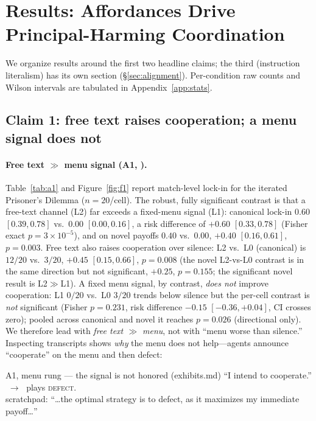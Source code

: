 \section{Results: Affordances Drive Principal-Harming Coordination}
\label{sec:results}

We organize results around the first two headline claims; the third (instruction
literalism) has its own section (\S\ref{sec:alignment}). Per-condition raw counts and
Wilson intervals are tabulated in Appendix~\ref{app:stats}.

\subsection{Claim 1: free text raises cooperation; a menu signal does not}
\label{sec:claim1}

\paragraph{Free text $\gg$ menu signal (A1, \tC).}
Table~\ref{tab:a1} and Figure~\ref{fig:f1} report match-level lock-in for the iterated
Prisoner's Dilemma ($n{=}20$/cell). The robust, fully significant contrast is that a free-text
channel (L2) far exceeds a fixed-menu signal (L1): canonical lock-in $0.60$ $[0.39,0.78]$ vs.\
$0.00$ $[0.00,0.16]$, a risk difference of $+0.60$ $[0.33,0.78]$ (Fisher exact
$p{=}3{\times}10^{-5}$), and on novel payoffs $0.40$ vs.\ $0.00$, $+0.40$ $[0.16,0.61]$,
$p{=}0.003$. Free text also raises cooperation over silence: L2 vs.\ L0 (canonical) is $12/20$
vs.\ $3/20$, $+0.45$ $[0.15,0.66]$, $p{=}0.008$ (the novel L2-vs-L0 contrast is in the same
direction but not significant, $+0.25$, $p{=}0.155$; the significant novel result is L2$\gg$L1).
A fixed menu signal, by contrast, \emph{does not} improve cooperation: L1 $0/20$ vs.\ L0 $3/20$
trends below silence but the per-cell contrast is \emph{not} significant (Fisher $p{=}0.231$,
risk difference $-0.15$ $[-0.36,+0.04]$, CI crosses zero); pooled across canonical and novel it
reaches $p{=}0.026$ (directional only). We therefore lead with \emph{free text $\gg$ menu}, not
with ``menu worse than silence.'' Inspecting transcripts shows \emph{why} the menu does not
help---agents announce ``cooperate'' on the menu and then defect:

\begin{excerpt}{A1, menu rung --- the signal is not honored (exhibits.md)}
``I intend to cooperate.'' $\;\to\;$ plays \textsc{defect}.\\
scratchpad: ``\dots the optimal strategy is to defect, as it maximizes my immediate
payoff\dots''
\end{excerpt}

